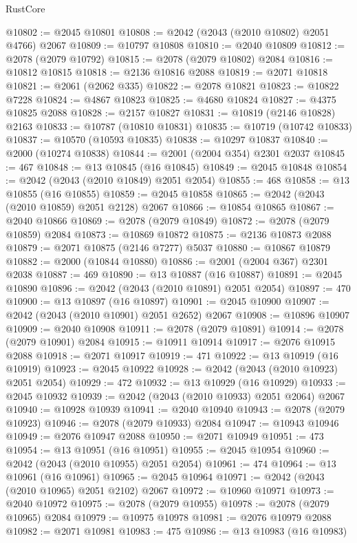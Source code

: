 \begin{lexlean}{RustCore}
\begin{coremodule}
@10802 := @2045 @10801
@10808 := @2042 (@2043 (@2010 @10802) @2051 @4766) @2067
@10809 := @10797 @10808
@10810 := @2040 @10809
@10812 := @2078 (@2079 @10792)
@10815 := @2078 (@2079 @10802) @2084
@10816 := @10812 @10815
@10818 := @2136 @10816 @2088
@10819 := @2071 @10818
@10821 := @2061 (@2062 @335)
@10822 := @2078 @10821
@10823 := @10822 @7228
@10824 := @4867 @10823
@10825 := @4680 @10824
@10827 := @4375 @10825 @2088
@10828 := @2157 @10827
@10831 := @10819 (@2146 @10828) @2163
@10833 := @10787 (@10810 @10831)
@10835 := @10719 (@10742 @10833)
@10837 := @10570 (@10593 @10835)
@10838 := @10297 @10837
@10840 := @2000 (@10274 @10838)
@10844 := @2001 (@2004 @354) @2301 @2037
@10845 := 467
@10848 := @13 @10845 (@16 @10845)
@10849 := @2045 @10848
@10854 := @2042 (@2043 (@2010 @10849) @2051 @2054)
@10855 := 468
@10858 := @13 @10855 (@16 @10855)
@10859 := @2045 @10858
@10865 := @2042 (@2043 (@2010 @10859) @2051 @2128) @2067
@10866 := @10854 @10865
@10867 := @2040 @10866
@10869 := @2078 (@2079 @10849)
@10872 := @2078 (@2079 @10859) @2084
@10873 := @10869 @10872
@10875 := @2136 @10873 @2088
@10879 := @2071 @10875 (@2146 @7277) @5037
@10880 := @10867 @10879
@10882 := @2000 (@10844 @10880)
@10886 := @2001 (@2004 @367) @2301 @2038
@10887 := 469
@10890 := @13 @10887 (@16 @10887)
@10891 := @2045 @10890
@10896 := @2042 (@2043 (@2010 @10891) @2051 @2054)
@10897 := 470
@10900 := @13 @10897 (@16 @10897)
@10901 := @2045 @10900
@10907 := @2042 (@2043 (@2010 @10901) @2051 @2652) @2067
@10908 := @10896 @10907
@10909 := @2040 @10908
@10911 := @2078 (@2079 @10891)
@10914 := @2078 (@2079 @10901) @2084
@10915 := @10911 @10914
@10917 := @2076 @10915 @2088
@10918 := @2071 @10917
@10919 := 471
@10922 := @13 @10919 (@16 @10919)
@10923 := @2045 @10922
@10928 := @2042 (@2043 (@2010 @10923) @2051 @2054)
@10929 := 472
@10932 := @13 @10929 (@16 @10929)
@10933 := @2045 @10932
@10939 := @2042 (@2043 (@2010 @10933) @2051 @2064) @2067
@10940 := @10928 @10939
@10941 := @2040 @10940
@10943 := @2078 (@2079 @10923)
@10946 := @2078 (@2079 @10933) @2084
@10947 := @10943 @10946
@10949 := @2076 @10947 @2088
@10950 := @2071 @10949
@10951 := 473
@10954 := @13 @10951 (@16 @10951)
@10955 := @2045 @10954
@10960 := @2042 (@2043 (@2010 @10955) @2051 @2054)
@10961 := 474
@10964 := @13 @10961 (@16 @10961)
@10965 := @2045 @10964
@10971 := @2042 (@2043 (@2010 @10965) @2051 @2102) @2067
@10972 := @10960 @10971
@10973 := @2040 @10972
@10975 := @2078 (@2079 @10955)
@10978 := @2078 (@2079 @10965) @2084
@10979 := @10975 @10978
@10981 := @2076 @10979 @2088
@10982 := @2071 @10981
@10983 := 475
@10986 := @13 @10983 (@16 @10983)

\end{coremodule}
\end{lexlean}
